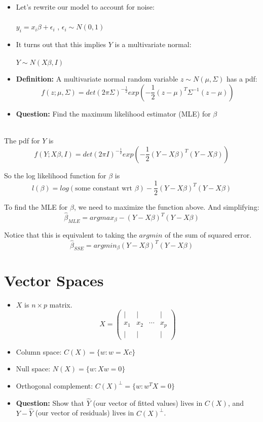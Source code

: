 \documentclass[12pt]{article}
\begin{document}
\begin{itemize}
	\item Let's rewrite our model to account for noise: \\ \\
	$y_i = x_i \beta + \epsilon_i$ ,  $\epsilon_i \sim N(0,1)$ \\
	\item It turns out that this implies $Y$ is a multivariate normal: \\ \\
	$Y \sim N(X \beta, I)$
	\item \textbf{Definition:} A multivariate normal random variable $z \sim N(\mu, \Sigma)$ has a pdf:
	$$ f(z; \mu, \Sigma) = det(2 \pi \Sigma)^{-\frac{1}{2}} exp(-\frac{1}{2} (z - \mu)^T \Sigma^{-1} (z-\mu))$$
	\item \textbf{Question:} Find the maximum likelihood estimator (MLE) for $\beta$ \\ \\
\end{itemize}

The pdf for $Y$ is
$$ f(Y; X \beta, I) = det(2 \pi I)^{-\frac{1}{2}} exp(-\frac{1}{2} (Y - X \beta)^T (Y - X \beta))$$

So the log likelihood function for $\beta$ is
$$ l(\beta) = log(\text{some constant wrt } \beta) -\frac{1}{2} (Y - X \beta)^T (Y - X \beta)$$

To find the MLE for $\beta$, we need to maximize the function above. And simplifying:
$$ \hat{\beta}_{MLE} = argmax_\beta -(Y - X \beta)^T (Y - X \beta)$$

Notice that this is equivalent to taking the $argmin$ of the sum of squared error.
$$ \hat{\beta}_{SSE} = argmin_\beta (Y - X \beta)^T (Y - X \beta)$$

\newpage

\section{Vector Spaces}
\begin{itemize}
	\item $X$ is $n \times p$ matrix.
	\begin{equation*}
	X = \left( 
	\begin{array}{cccc}
	| & | & & | \\
	x_1 & x_2 & \cdots & x_p \\
	| & | & & |
	\end{array} 
	\right)
	\end{equation*}
	\item Column space: $C(X) = \lbrace w : w = Xc \rbrace$
	\item Null space:  $N(X) = \lbrace w : Xw = 0 \rbrace$
	\item Orthogonal complement:  $C(X)^\perp = \lbrace w : w^T X = 0 \rbrace$
	\item \textbf{Question:} Show that $\hat{Y}$ (our vector of fitted values) lives in $C(X)$, and $Y - \hat{Y}$ (our vector of residuals) lives in $C(X)^\perp$. \\ \\
\end{itemize}
\end{document}
